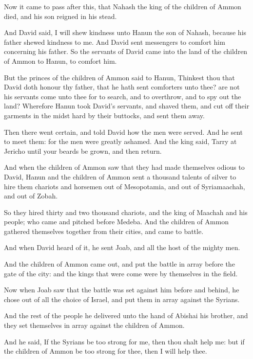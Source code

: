 \Chapter
\Verse Now it came to pass after this, that Nahash the king of the children of Ammon died, and his son reigned in his stead.

\Verse And David said, I will shew kindness unto Hanun the son of Nahash, because his father shewed kindness to me. And David sent messengers to comfort him concerning his father. So the servants of David came into the land of the children of Ammon to Hanun, to comfort him.

\Verse But the princes of the children of Ammon said to Hanun, Thinkest thou that David doth honour thy father, that he hath sent comforters unto thee?  are not his servants come unto thee for to search, and to overthrow, and to spy out the land?  \Verse Wherefore Hanun took David's servants, and shaved them, and cut off their garments in the midst hard by their buttocks, and sent them away.

\Verse Then there went certain, and told David how the men were served.  And he sent to meet them: for the men were greatly ashamed. And the king said, Tarry at Jericho until your beards be grown, and then return.

\Verse And when the children of Ammon saw that they had made themselves odious to David, Hanun and the children of Ammon sent a thousand talents of silver to hire them chariots and horsemen out of Mesopotamia, and out of Syriamaachah, and out of Zobah.

\Verse So they hired thirty and two thousand chariots, and the king of Maachah and his people; who came and pitched before Medeba. And the children of Ammon gathered themselves together from their cities, and came to battle.

\Verse And when David heard of it, he sent Joab, and all the host of the mighty men.

\Verse And the children of Ammon came out, and put the battle in array before the gate of the city: and the kings that were come were by themselves in the field.

\Verse Now when Joab saw that the battle was set against him before and behind, he chose out of all the choice of Israel, and put them in array against the Syrians.

\Verse And the rest of the people he delivered unto the hand of Abishai his brother, and they set themselves in array against the children of Ammon.

\Verse And he said, If the Syrians be too strong for me, then thou shalt help me: but if the children of Ammon be too strong for thee, then I will help thee.


